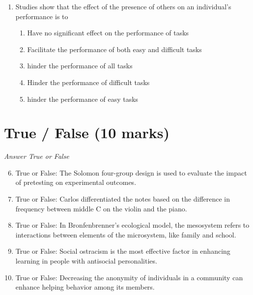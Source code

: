 \documentclass[12pt]{article}
\begin{document}
\begin{enumerate}[label=\arabic*.]
\begin{enumerate}[label=(\alph*)]
    \item Phonemes from the language most frequently spoken around the child.
    \item Phonetic sounds specific to the child's geographical location.
    \item Phonemes from the parents' native language only.
    \item morphemes that the child has heard most frequently.
\end{enumerate}
\item Studies show that the effect of the presence of others on an individual's performance is to
\begin{enumerate}[label=(\alph*)]
    \item Have no significant effect on the performance of tasks
    \item Facilitate the performance of both easy and difficult tasks
    \item hinder the performance of all tasks
    \item Hinder the performance of difficult tasks
    \item hinder the performance of easy tasks
\end{enumerate}
\end{enumerate}

\section*{True / False (10 marks)}
\textit{Answer True or False}
\begin{enumerate}[label=\arabic*.]
\setcounter{enumi}{5}
\item True or False: The Solomon four-group design is used to evaluate the impact of pretesting on experimental outcomes.
\item True or False: Carlos differentiated the notes based on the difference in frequency between middle C on the violin and the piano.
\item True or False: In Bronfenbrenner's ecological model, the mesosystem refers to interactions between elements of the microsystem, like family and school.
\item True or False: Social ostracism is the most effective factor in enhancing learning in people with antisocial personalities.
\item True or False: Decreasing the anonymity of individuals in a community can enhance helping behavior among its members.
\end{enumerate}
\end{document}
